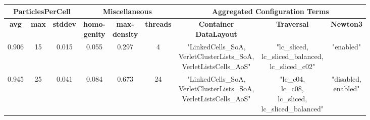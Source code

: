 \begin{table}[H]
    \centering
    \tiny
    \def\arraystretch{2.5}
    \begin{tabular}{|c|c|c|c|c|c|c|c|c|}
        \cline{1-9}
        \multicolumn{3}{|c|}{ \textbf{ParticlesPerCell}} & \multicolumn{3}{c|}{\textbf{Miscellaneous}} & \multicolumn{3}{c|}{\textbf{Aggregated Configuration Terms}}                                                                                                                               \\
        \hline
        \textbf{avg}                                     & \textbf{max}                                & \textbf{stddev}                                              & \tabularCenterstack{c}{\textbf{homo-}                                                                                       \\ \textbf{genity}} & \tabularCenterstack{c}{\textbf{max-} \\ \textbf{density}} & \textbf{threads} & \tabularCenterstack{c}{\textbf{Container} \\ \textbf{DataLayout}}& \textbf{Traversal} & \textbf{Newton3}  \\
        \hline
        0.906                                            & 15                                          & 0.015                                                        & 0.055                                 & 0.297  & 4      & \tabularCenterstack{c}{"LinkedCells\_SoA,                         \\ VerletClusterLists\_SoA, \\ VerletListsCells\_AoS"} & \tabularCenterstack{c}{"lc\_sliced, \\ lc\_sliced\_balanced, \\ lc\_sliced\_c02"} & "enabled"   \\
        \hline
        0.945                                            & 25                                          & 0.041                                                        & 0.084                                 & 0.673  & 24     & \tabularCenterstack{c}{"LinkedCells\_SoA,                         \\ VerletClusterLists\_SoA, \\ VerletListsCells\_AoS"} & \tabularCenterstack{c}{"lc\_c04, \\ lc\_c08, \\ lc\_sliced, \\ lc\_sliced\_balanced"} & \tabularCenterstack{c}{"disabled, \\ enabled"}  \\

\end{tabular}
\end{table}
